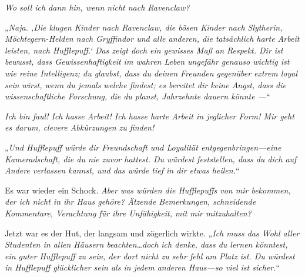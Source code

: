 \emph{Wo soll ich dann hin, wenn nicht nach Ravenclaw? }

„\emph{Naja. ‚Die klugen Kinder nach Ravenclaw, die bösen Kinder nach Slytherin, Möchtegern-Helden nach Gryffindor und alle anderen, die tatsächlich harte Arbeit leisten, nach Hufflepuff.‘ Das zeigt doch ein gewisses Maß an Respekt. Dir ist bewusst, dass Gewissenhaftigkeit im wahren Leben ungefähr genauso wichtig ist wie reine Intelligenz; du glaubst, dass du deinen Freunden gegenüber extrem loyal sein wirst, wenn du jemals welche findest; es bereitet dir keine Angst, dass die wissenschaftliche Forschung, die du planst, Jahrzehnte dauern könnte —}“

\emph{Ich bin faul! Ich hasse Arbeit! Ich hasse harte Arbeit in jeglicher Form! Mir geht es darum, clevere Abkürzungen zu finden! }

„\emph{Und Hufflepuff würde dir Freundschaft und Loyalität entgegenbringen—eine Kameradschaft, die du nie zuvor hattest. Du würdest feststellen, dass du dich auf Andere verlassen kannst, und das würde tief in dir etwas heilen.}“

Es war wieder ein Schock. \emph{Aber was würden die Hufflepuffs von \emph{mir} bekommen, der ich nicht in ihr Haus gehöre? Ätzende Bemerkungen, schneidende Kommentare, Verachtung für ihre Unfähigkeit, mit mir mitzuhalten?}

Jetzt war es der Hut, der langsam und zögerlich wirkte. „\emph{Ich muss das Wohl aller Studenten in allen Häusern beachten…doch ich denke, dass du lernen könntest, ein guter Hufflepuff zu sein, der dort nicht zu sehr fehl am Platz ist. Du würdest in Hufflepuff glücklicher sein als in jedem anderen Haus—so viel ist sicher.}“

